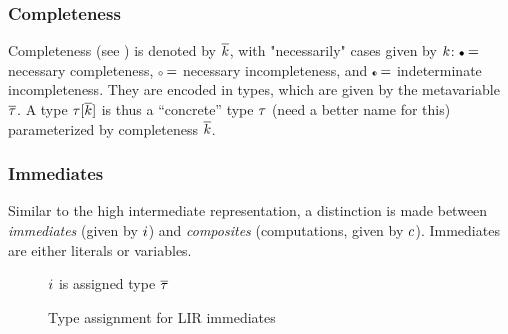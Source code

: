 \documentclass[index.tex]{subfiles}
\begin{document}
\subsubsection{Completeness}
\label{sec:lir-completeness}
Completeness (see ) is denoted by $\overline{k}$, with "necessarily" cases given
by $k$: $\CNC =$ necessary completeness, $\CNI =$ necessary incompleteness, and
$\CII =$ indeterminate incompleteness. They are encoded in types, which are given by the
metavariable $\overline{\tau}$. A type $\tau[\overline{k}]$ is thus a ``concrete''
type $\tau$ (need a better name for this) parameterized by completeness
$\overline{k}$.

\subsubsection{Immediates}
\label{sec:lir-immediates}
Similar to the high intermediate representation, a distinction is made between \emph{immediates}
(given by $i$) and \emph{composites} (computations, given by $c$). Immediates
are either literals or variables.

\begin{figure}
  \judgbox{\hasTypeCtx{\CtxVar}{\HoleCtxVar}{\SortImmVar}{\SortTypVar}}
    $i$ is assigned type $\overline{\tau}$ \\
  
  \caption{Type assignment for LIR immediates}
  \label{fig:lir-ta-imm}
\end{figure}
\end{document}
